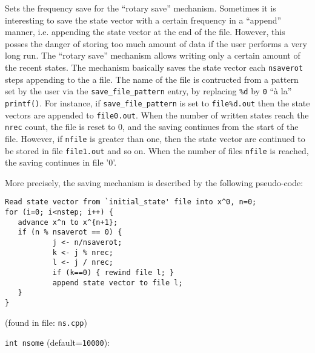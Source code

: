 Sets the frequency save for the ``rotary save'' mechanism. 
\label{sec:rotary_save}
Sometimes it is interesting to save the state vector with a certain
frequency in a ``append'' manner, i.e. appending the state vector at
the end of the file. However, this posses the danger of storing too
much amount of data if the user performs a very long run. The ``rotary
save'' mechanism allows writing only a certain amount of the recent
states. The mechanism basically saves the state vector each
\verb+nsaverot+ steps appending to the a file. The name of the file is
contructed from a pattern set by the user via the
\verb+save_file_pattern+ entry, by replacing \verb+%d+ 
by \verb+0+ ``\`a la'' \verb+printf()+. For instance, if
\verb+save_file_pattern+ is set to \verb+file%d.out+ 
then the state vectors are appended to \verb+file0.out+.  When the
number of written states reach the \verb+nrec+ count, the file is
reset to 0, and the saving continues from the start of the
file. However, if \verb+nfile+ is greater than one, then the state
vector are continued to be stored in file \verb+file1.out+ and so
on. When the number of files \verb+nfile+ is reached, the saving
continues in file '0'.

More precisely, the saving mechanism is described by the following
pseudo-code:

\begin{verbatim}
Read state vector from `initial_state' file into x^0, n=0;
for (i=0; i<nstep; i++) {
   advance x^n to x^{n+1};
   if (n % nsaverot == 0) {
           j <- n/nsaverot;
           k <- j % nrec;
           l <- j / nrec;
           if (k==0) { rewind file l; }
           append state vector to file l;
   }
}
\end{verbatim}
 (found in file: \verb+ns.cpp+)
\item\verb+int nsome+ {\rm(default=\verb|10000|)}:

